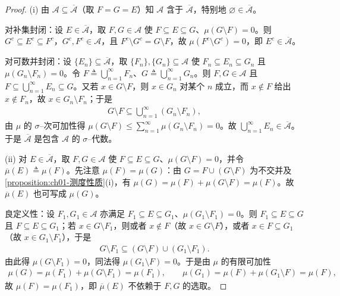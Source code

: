 \documentclass[../../main.tex]{subfiles}%
\begin{document}
\begin{proof}
(i) 由 $\mathcal{A}\subseteq\overline{\mathcal{A}}$（取 $F=G=E$）知 $\mathcal{A}$ 含于 $\overline{\mathcal{A}}$，特别地 $\varnothing \in\overline{\mathcal{A}}$。

对补集封闭：设 $E\in\overline{\mathcal{A}}$，取 $F,G\in\mathcal{A}$ 使 $F\subseteq E\subseteq G$、$\mu(G\setminus F)=0$。则 $G^c\subseteq E^c\subseteq F^c$，$G^c,F^c\in\mathcal{A}$，且 $F^c\setminus G^c=G\setminus F$，故 $\mu(F^c\setminus G^c)=0$，即 $E^c\in\overline{\mathcal{A}}$。

对可数并封闭：设 $\{E_n\}\subseteq\overline{\mathcal{A}}$，取 $\{F_n\},\{G_n\}\subseteq\mathcal{A}$ 使 $F_n\subseteq E_n\subseteq G_n$ 且 $\mu(G_n\setminus F_n)=0$。令 $F\triangleq\bigcup_{n=1}^\infty F_n$、$G\triangleq\bigcup_{n=1}^\infty G_n$。则 $F,G\in\mathcal{A}$ 且 $F\subseteq\bigcup_{n=1}^\infty E_n\subseteq G$。又若 $x\in G\setminus F$，则 $x\in G_n$ 对某个 $n$ 成立，而 $x\notin F$ 给出 $x\notin F_n$，故 $x\in G_n\setminus F_n$；于是
\begin{align*}
G\setminus F\subseteq\bigcup_{n=1}^\infty(G_n\setminus F_n),
\end{align*}
由 $\mu$ 的 $\sigma$--次可加性得 $\mu(G\setminus F)\leqslant\sum_{n=1}^\infty\mu(G_n\setminus F_n)=0$。故 $\bigcup_{n=1}^\infty E_n\in\overline{\mathcal{A}}$。于是 $\overline{\mathcal{A}}$ 是包含 $\mathcal{A}$ 的 $\sigma$--代数。

(ii) 对 $E\in\overline{\mathcal{A}}$，取 $F,G\in\mathcal{A}$ 使 $F\subseteq E\subseteq G$、$\mu(G\setminus F)=0$，并令 $\overline{\mu}(E)\triangleq\mu(F)$。先注意 $\mu(F)=\mu(G)$：由 $G=F\cup(G\setminus F)$ 为不交并及\cref{proposition:ch01-测度性质}(i)，有 $\mu(G)=\mu(F)+\mu(G\setminus F)=\mu(F)$。故 $\overline{\mu}(E)$ 也可写成 $\mu(G)$。

良定义性：设 $F_1,G_1\in\mathcal{A}$ 亦满足 $F_1\subseteq E\subseteq G_1$、$\mu(G_1\setminus F_1)=0$。则 $F_1\subseteq E\subseteq G$ 且 $F\subseteq E\subseteq G_1$；若 $x\in G\setminus F_1$，则或者 $x\notin F$（故 $x\in G\setminus F$），或者 $x\in F\subseteq G_1$（故 $x\in G_1\setminus F_1$），于是
\begin{align*}
G\setminus F_1\subseteq(G\setminus F)\cup(G_1\setminus F_1).
\end{align*}
由此得 $\mu(G\setminus F_1)=0$，同法得 $\mu(G_1\setminus F)=0$。于是由 $\mu$ 的有限可加性
\begin{align*}
\mu(G)=\mu(F_1)+\mu(G\setminus F_1)=\mu(F_1),\qquad\mu(G_1)=\mu(F)+\mu(G_1\setminus F)=\mu(F),
\end{align*}
故 $\mu(F)=\mu(F_1)$，即 $\overline{\mu}(E)$ 不依赖于 $F,G$ 的选取。


\end{proof}
\end{document}
